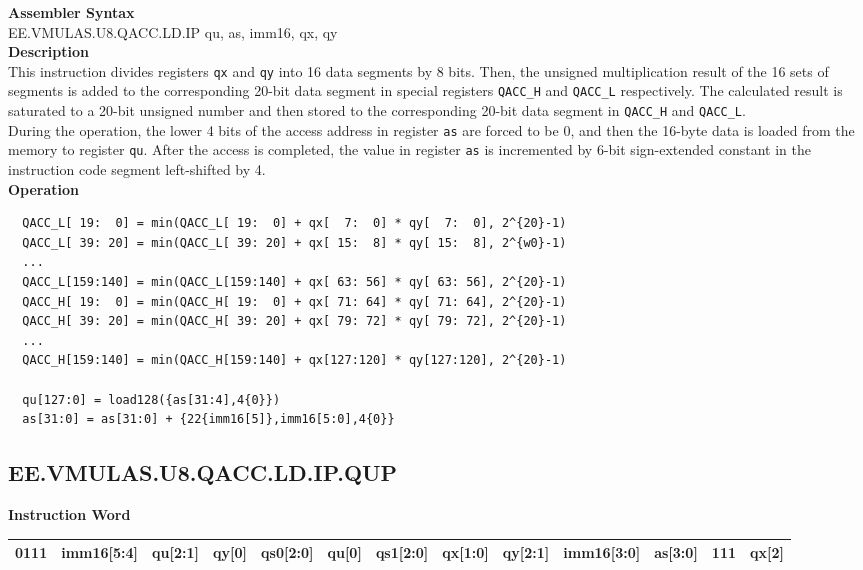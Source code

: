 \textbf{Assembler Syntax} \\
EE.VMULAS.U8.QACC.LD.IP qu, as, imm16, qx, qy \\
\textbf{Description} \\
This instruction divides registers \lstinline{qx} and \lstinline{qy} into 16 data segments by 8 bits. Then, the unsigned multiplication result of the 16 sets of segments is added to the corresponding 20-bit data segment in special registers \lstinline{QACC_H} and \lstinline{QACC_L} respectively. The calculated result is saturated to a 20-bit unsigned number and then stored to the corresponding 20-bit data segment in \lstinline{QACC_H} and \lstinline{QACC_L}.\\
During the operation, the lower 4 bits of the access address in register \lstinline{as} are forced to be 0, and then the 16-byte data is loaded from the memory to register \lstinline{qu}. After the access is completed, the value in register \lstinline{as} is incremented by 6-bit sign-extended constant in the instruction code segment left-shifted by 4.\\
\textbf{Operation}
\begin{lstlisting}
  QACC_L[ 19:  0] = min(QACC_L[ 19:  0] + qx[  7:  0] * qy[  7:  0], 2^{20}-1)
  QACC_L[ 39: 20] = min(QACC_L[ 39: 20] + qx[ 15:  8] * qy[ 15:  8], 2^{w0}-1)
  ...
  QACC_L[159:140] = min(QACC_L[159:140] + qx[ 63: 56] * qy[ 63: 56], 2^{20}-1)
  QACC_H[ 19:  0] = min(QACC_H[ 19:  0] + qx[ 71: 64] * qy[ 71: 64], 2^{20}-1)
  QACC_H[ 39: 20] = min(QACC_H[ 39: 20] + qx[ 79: 72] * qy[ 79: 72], 2^{20}-1)
  ...
  QACC_H[159:140] = min(QACC_H[159:140] + qx[127:120] * qy[127:120], 2^{20}-1)

  qu[127:0] = load128({as[31:4],4{0}})
  as[31:0] = as[31:0] + {22{imm16[5]},imm16[5:0],4{0}}
\end{lstlisting}

\clearpage
\subsection{EE.VMULAS.U8.QACC.LD.IP.QUP}\label{instruction:EEVMULASU8QACCLDIPQUP}
\setlength\tabcolsep{5pt}
\textbf{Instruction Word} \\
\begin{tabular}{|c|c|c|c|c|c|c|c|c|c|c|c|c|}
	\hline
	0111 & imm16[5:4] & qu[2:1] & qy[0] & qs0[2:0] & qu[0] & qs1[2:0] & qx[1:0] & qy[2:1] & imm16[3:0] & as[3:0] & 111 & qx[2] \\
	\hline
\end{tabular}

